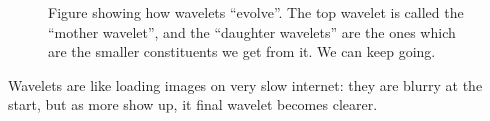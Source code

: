 \begin{example}
\begin{itemize}
\begin{figure}[H]
            \caption{Figure showing how wavelets ``evolve''. The top wavelet is called the ``mother wavelet'', and the ``daughter wavelets'' are the ones which are the smaller constituents we get from it. We can keep going.}
        \end{figure}
        Wavelets are like loading images on very slow internet: they are blurry at the start, but as more show up, it final wavelet becomes clearer.
    \end{itemize}
\end{example}

